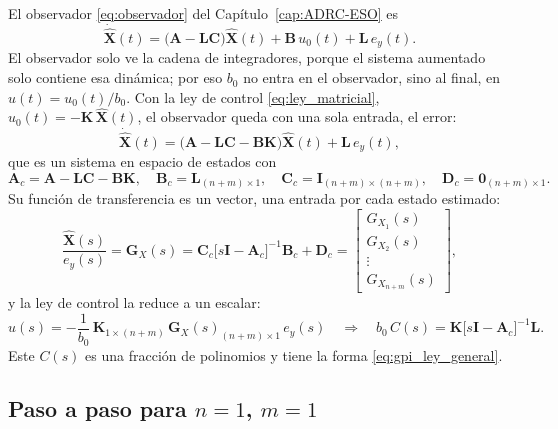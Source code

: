 El observador \eqref{eq:observador} del Capítulo~\ref{cap:ADRC-ESO} es
\begin{equation}
\dot{\widehat{\mathbf{X}}}(t) = \bigl(\mathbf{A} - \mathbf{L}\mathbf{C}\bigr)\widehat{\mathbf{X}}(t)
+ \mathbf{B}\,u_0(t) + \mathbf{L}\,e_y(t) .
\end{equation}
El observador solo ve la cadena de integradores, porque el sistema aumentado
solo contiene esa dinámica; por eso $b_0$ no entra en el observador, sino al
final, en $u(t) = u_0(t)/b_0$. Con la ley de control \eqref{eq:ley_matricial},
$u_0(t) = -\mathbf{K}\,\widehat{\mathbf{X}}(t)$, el observador queda con una sola
entrada, el error:
\begin{equation}
\dot{\widehat{\mathbf{X}}}(t) = \bigl(\mathbf{A} - \mathbf{L}\mathbf{C} - \mathbf{B}\mathbf{K}\bigr)\widehat{\mathbf{X}}(t)
+ \mathbf{L}\,e_y(t) ,
\end{equation}
que es un sistema en espacio de estados con
\begin{equation}
\mathbf{A}_c = \mathbf{A} - \mathbf{L}\mathbf{C} - \mathbf{B}\mathbf{K},\quad
\mathbf{B}_c = \mathbf{L}_{(n+m)\times 1},\quad
\mathbf{C}_c = \mathbf{I}_{(n+m)\times(n+m)},\quad
\mathbf{D}_c = \mathbf{0}_{(n+m)\times 1} .
\end{equation}
Su función de transferencia es un vector, una entrada por cada estado estimado:
\begin{equation}
\frac{\widehat{\mathbf{X}}(s)}{e_y(s)} = \mathbf{G}_X(s)
= \mathbf{C}_c\bigl[s\mathbf{I} - \mathbf{A}_c\bigr]^{-1}\mathbf{B}_c + \mathbf{D}_c
= \begin{bmatrix} G_{X_1}(s) \\ G_{X_2}(s) \\ \vdots \\ G_{X_{n+m}}(s) \end{bmatrix} ,
\end{equation}
y la ley de control la reduce a un escalar:
\begin{equation}
u(s) = -\frac{1}{b_0}\,\mathbf{K}_{1\times(n+m)}\,\mathbf{G}_X(s)_{(n+m)\times 1}\,e_y(s)
\quad\Longrightarrow\quad
b_0\,C(s) = \mathbf{K}\bigl[s\mathbf{I} - \mathbf{A}_c\bigr]^{-1}\mathbf{L} .
\label{eq:gpi_eso_general}
\end{equation}
Este $C(s)$ es una fracción de polinomios y tiene la forma
\eqref{eq:gpi_ley_general}.

\subsection{Paso a paso para $n = 1$, $m = 1$}
\label{subsec:gpi_eso_tf}


